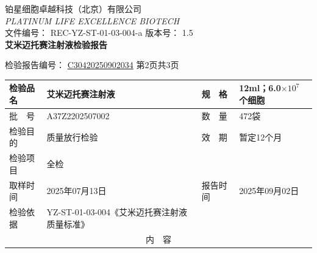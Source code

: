 \documentclass[UTF8,10pt,a4paper,fontset=fandol]{ctexart}
\newcommand{\fieldvalue}[1]{#1}
\begin{document}
\newpage

\begin{center}
铂星细胞卓越科技（北京）有限公司\\
\textit{PLATINUM LIFE EXCELLENCE BIOTECH}\\[0.5em]
文件编号：
\fieldvalue{REC-YZ-ST-01-03-004-a}
\qquad 版本号：
\fieldvalue{1.5}\\[0.5em]
{\large\textbf{艾米迈托赛注射液检验报告}}
\end{center}

检验报告编号：
\fieldvalue{\underline{C30420250902034}}
第2页共3页

\begin{tabularx}{\textwidth}{|p{3.2cm}|X|p{3.0cm}|X|}
\hline
检验品名 &
\fieldvalue{艾米迈托赛注射液}
& 规　格 &
\fieldvalue{12ml；6.0$\times 10^{7}$个细胞}
\\ \hline
批　号 &
\fieldvalue{A37Z2202507002}
& 数　量 &
\fieldvalue{472袋}
\\ \hline
检验目的 &
\fieldvalue{质量放行检验}
& 效　期 &
\fieldvalue{暂定12个月}
\\ \hline
检验项目 &
\fieldvalue{全检}
& \multicolumn{2}{l|}{}
\\ \hline
取样时间 &
\fieldvalue{2025年07月13日}
& 报告时间 &
\fieldvalue{2025年09月02日}
\\ \hline
检验依据 &
\fieldvalue{YZ-ST-01-03-004《艾米迈托赛注射液质量标准》}
& \multicolumn{2}{l|}{}
\\ \hline
\multicolumn{4}{|c|}{内　容}\\ \hline
\end{tabularx}
\end{document}
